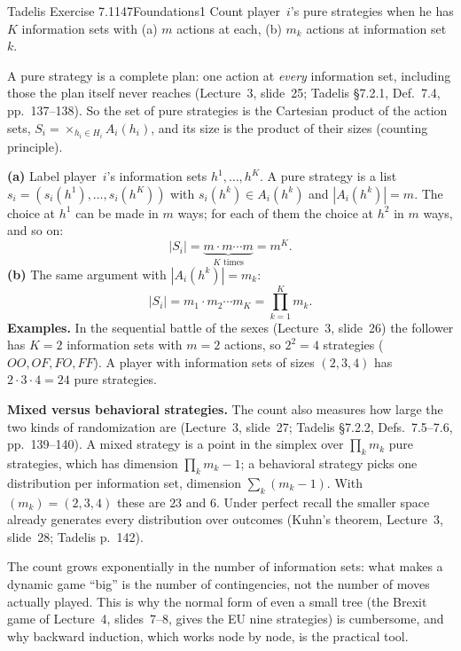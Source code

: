 \begin{exsol}{Tadelis Exercise 7.1}{147}{Foundations}{1}
\asked Count player~$i$'s pure strategies when he has $K$ information sets with (a) $m$ actions
at each, (b) $m_k$ actions at information set $k$.

\method A pure strategy is a complete plan: one action at \emph{every} information set,
including those the plan itself never reaches (Lecture~3, slide~25; Tadelis \S7.2.1, Def.~7.4,
pp.~137--138). So the set of pure strategies is the Cartesian product of the action sets,
$S_i = \times_{h_i \in H_i} A_i(h_i)$, and its size is the product of their sizes (counting
principle).

\solution
\textbf{(a)} Label player~$i$'s information sets $h^1, \dots, h^K$. A pure strategy is a list
$s_i = (s_i(h^1), \dots, s_i(h^K))$ with $s_i(h^k) \in A_i(h^k)$ and $|A_i(h^k)| = m$. The choice
at $h^1$ can be made in $m$ ways; for each of them the choice at $h^2$ in $m$ ways, and so on:
\[
  |S_i| = \underbrace{m \cdot m \cdots m}_{K \text{ times}} = m^K .
\]
\textbf{(b)} The same argument with $|A_i(h^k)| = m_k$:
\[
  |S_i| = m_1 \cdot m_2 \cdots m_K = \prod_{k=1}^{K} m_k .
\]
\textbf{Examples.} In the sequential battle of the sexes (Lecture~3, slide~26) the follower has
$K = 2$ information sets with $m = 2$ actions, so $2^2 = 4$ strategies ($OO, OF, FO, FF$). A
player with information sets of sizes $(2, 3, 4)$ has $2\cdot3\cdot4 = 24$ pure strategies.

\textbf{Mixed versus behavioral strategies.} The count also measures how large the two kinds
of randomization are (Lecture~3, slide~27; Tadelis \S7.2.2, Defs.~7.5--7.6, pp.~139--140). A mixed
strategy is a point in the simplex over $\prod_k m_k$ pure strategies, which has dimension
$\prod_k m_k - 1$; a behavioral strategy picks one distribution per information set, dimension
$\sum_k (m_k - 1)$. With $(m_k) = (2, 3, 4)$ these are $23$ and $6$. Under perfect recall the
smaller space already generates every distribution over outcomes (Kuhn's theorem, Lecture~3,
slide~28; Tadelis p.~142).

\interp The count grows exponentially in the number of information sets: what makes a dynamic
game ``big'' is the number of contingencies, not the number of moves actually played. This is
why the normal form of even a small tree (the Brexit game of Lecture~4, slides~7--8, gives the
EU nine strategies) is cumbersome, and why backward induction, which works node by node, is
the practical tool.


\end{exsol}
